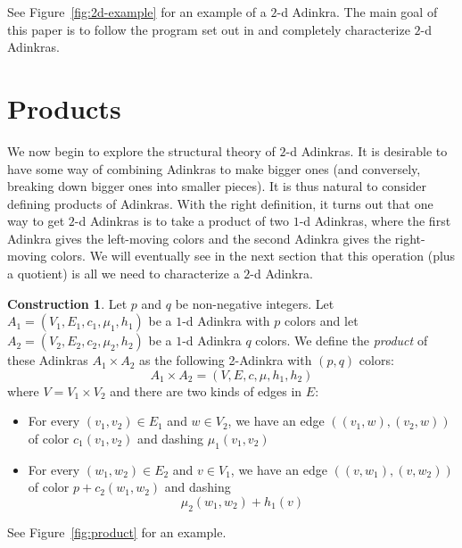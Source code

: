 \documentclass[12pt,twoside,singlespace]{article}
\numberwithin{equation}{section}
\theoremstyle{definition}
\newtheorem{construction}[equation]{Construction}
\begin{document}
See Figure~\ref{fig:2d-example} for an example of a $2$-d Adinkra. The main goal of this paper is to follow the program set out in \cite{hubsch:weaving} and completely characterize $2$-d Adinkras.

\section{Products}
\label{sec:products}

We now begin to explore the structural theory of $2$-d Adinkras. It is desirable to have some way of combining Adinkras to make bigger ones (and conversely, breaking down bigger ones into smaller pieces). It is thus natural to consider defining products of Adinkras. With the right definition, it turns out that one way to get $2$-d Adinkras is to take a product of two $1$-d Adinkras, where the first Adinkra gives the left-moving colors and the second Adinkra gives the right-moving colors. We will eventually see in the next section that this operation (plus a quotient) is all we need to characterize a $2$-d Adinkra.

\begin{construction}
\label{const:product}
Let $p$ and $q$ be non-negative integers.  Let $A_1=(V_1, E_1, c_1, \mu_1,h_1)$ be a $1$-d Adinkra with $p$ colors and let $A_2=(V_2, E_2, c_2, \mu_2,h_2)$ be a $1$-d Adinkra $q$ colors.  We define the \emph{product} of these Adinkras $A_1\times A_2$ as the following 2-Adinkra with $(p,q)$ colors:
\[A_1\times A_2=(V,E,c,\mu,h_1,h_2)\]
where $V=V_1\times V_2$ and there are two kinds of edges in $E$:
\begin{itemize}
\item For every $(v_1,v_2)\in E_1$ and $w\in V_2$, we have an edge $((v_1,w),(v_2,w))$ of color $c_1(v_1,v_2)$ and dashing $\mu_1(v_1,v_2)$
\item For every $(w_1,w_2)\in E_2$ and $v\in V_1$, we have an edge $((v,w_1),(v,w_2))$ of color $p+c_2(w_1,w_2)$ and dashing
\begin{equation}
\label{eqn:dashprodshift}
\mu_2(w_1,w_2)+h_1(v)
\end{equation}
\end{itemize}
 See Figure~\ref{fig:product} for an example.
\end{construction}
\end{document}
